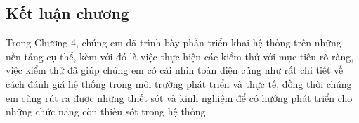  











  



 








\subsection{Kết luận chương}
  Trong Chương 4, chúng em đã trình bày phần triển khai hệ thống trên những nền tảng cụ thể, kèm với đó là việc thực hiện
  các kiểm thử với mục tiêu rõ ràng, việc kiểm thử đã giúp chúng em có cái nhìn toàn diện cũng như rất chi tiết về cách đánh giá 
  hệ thống trong môi trường phát triển và thực tế, đồng thời chúng em cũng rút ra được những thiết sót và kinh nghiệm
  để có hướng phát triển cho những chức năng còn thiếu sót trong hệ thống.
\newpage
